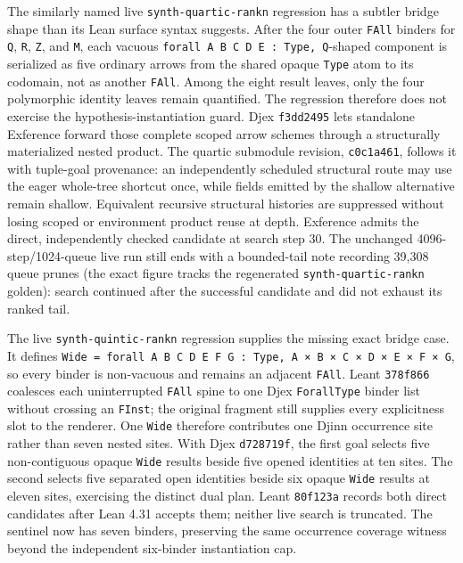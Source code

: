 \documentclass[11pt,oneside]{article}
\newcommand{\code}[1]{\texttt{#1}}
\begin{document}
The similarly named live \code{synth-quartic-rankn} regression has a subtler
bridge shape than its Lean surface syntax suggests. After the four outer
\code{FAll} binders for \code{Q}, \code{R}, \code{Z}, and \code{M}, each
vacuous \code{forall A B C D E : Type, Q}-shaped component is serialized as
five ordinary arrows from the shared opaque \code{Type} atom to its codomain,
not as another \code{FAll}. Among the eight result leaves, only the four
polymorphic identity leaves remain quantified. The regression
therefore does not exercise the hypothesis-instantiation
guard. Djex \code{f3dd2495} lets standalone Exference forward those complete
scoped arrow schemes through a structurally materialized nested product. The
quartic submodule revision, \code{c0c1a461}, follows it with tuple-goal provenance:
an independently scheduled structural route may use the eager whole-tree
shortcut once, while fields emitted by the shallow alternative remain
shallow. Equivalent recursive structural histories are suppressed without
losing scoped or environment product reuse at depth. Exference admits the
direct, independently checked candidate at search step 30. The unchanged
4096-step/1024-queue live run still ends with a bounded-tail note recording
39{,}308 queue prunes (the exact figure tracks the regenerated
\code{synth-quartic-rankn} golden): search continued after the successful
candidate and did not exhaust its ranked tail.

The live \code{synth-quintic-rankn} regression supplies the missing exact
bridge case. It defines
\code{Wide = forall A B C D E F G : Type, A × B × C × D × E × F × G}, so
every binder is non-vacuous and remains an adjacent \code{FAll}. Leant
\code{378f866} coalesces
each uninterrupted \code{FAll} spine to one Djex \code{ForallType} binder list
without crossing an \code{FInst}; the original fragment still supplies every
explicitness slot to the renderer. One \code{Wide} therefore contributes one
Djinn occurrence site rather than seven nested sites. With Djex
\code{d728719f}, the first goal selects five non-contiguous opaque
\code{Wide} results beside five opened identities at ten sites. The second
selects five separated open identities beside six opaque \code{Wide} results at
eleven sites, exercising the distinct dual plan. Leant \code{80f123a} records
both direct candidates after Lean 4.31 accepts them; neither live search is
truncated. The sentinel now has seven binders, preserving the same occurrence
coverage witness beyond the independent six-binder instantiation cap.
\end{document}
